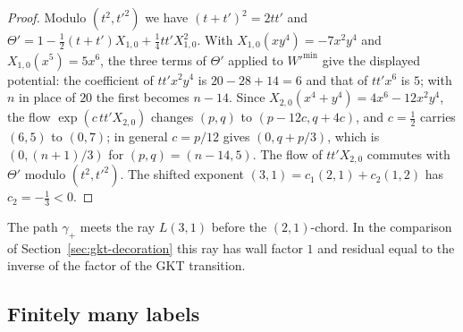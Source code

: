 \begin{proof}
Modulo $(t^2,t'^2)$ we have $(t+t')^2=2tt'$ and
$\Theta'=1-\tfrac12(t+t')X_{1,0}+\tfrac14tt'X_{1,0}^2$.  With
$X_{1,0}(xy^4)=-7x^2y^4$ and $X_{1,0}(x^5)=5x^6$, the three terms of
$\Theta'$ applied to $W'^{\min}$ give the displayed potential: the
coefficient of $tt'x^2y^4$ is $20-28+14=6$ and that of $tt'x^6$ is $5$;
with $n$ in place of $20$ the first becomes $n-14$.
Since $X_{2,0}(x^4+y^4)=4x^6-12x^2y^4$, the flow $\exp(c\,tt'X_{2,0})$
changes $(p,q)$ to $(p-12c,q+4c)$, and $c=\tfrac12$ carries $(6,5)$ to
$(0,7)$; in general $c=p/12$ gives $(0,q+p/3)$, which is $(0,(n+1)/3)$ for
$(p,q)=(n-14,5)$.  The flow of $tt'X_{2,0}$ commutes with $\Theta'$ modulo
$(t^2,t'^2)$.  The shifted exponent $(3,1)=c_1(2,1)+c_2(1,2)$ has
$c_2=-\tfrac13<0$.
\end{proof}

The path $\gamma_+$ meets the ray $L(3,1)$ before the $(2,1)$-chord.  In the
comparison of Section~\ref{sec:gkt-decoration} this ray has wall factor
$1$ and residual equal to the inverse of the factor of the GKT transition.

\subsection{Finitely many labels}

